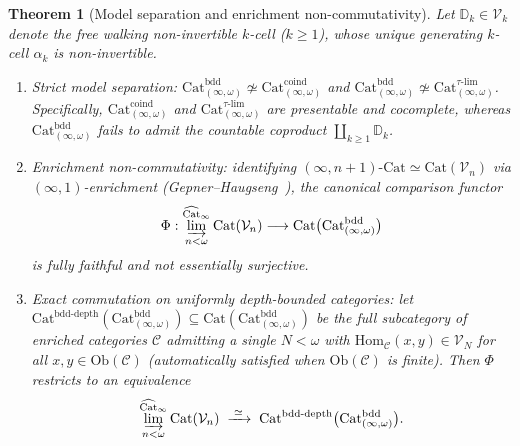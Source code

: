 \documentclass[11pt]{article}
\theoremstyle{plain}
\newtheorem{theorem}{Theorem}[section]
\theoremstyle{definition}
\newcommand{\cC}{\mathcal{C}}
\newcommand{\Ob}{\mathrm{Ob}}
\newcommand{\Hom}{\mathrm{Hom}}
\newcommand{\Cat}{\mathrm{Cat}}
\begin{document}
\begin{theorem}[Model separation and enrichment non-commutativity]\label{thm:enrichment-noncommutativity}
Let $\mathbb{D}_k \in \mathcal{V}_k$ denote the free walking non-invertible $k$-cell ($k \ge 1$), whose unique generating $k$-cell $\alpha_k$ is non-invertible.
\begin{enumerate}[nosep,label=(\roman*)]
\item \emph{Strict model separation}: $\Cat_{(\infty,\omega)}^{\mathrm{bdd}} \not\simeq \Cat_{(\infty,\omega)}^{\mathrm{coind}}$ and $\Cat_{(\infty,\omega)}^{\mathrm{bdd}} \not\simeq \Cat_{(\infty,\omega)}^{\tau\text{-}\mathrm{lim}}$. Specifically, $\Cat_{(\infty,\omega)}^{\mathrm{coind}}$ and $\Cat_{(\infty,\omega)}^{\tau\text{-}\mathrm{lim}}$ are presentable and cocomplete, whereas $\Cat_{(\infty,\omega)}^{\mathrm{bdd}}$ fails to admit the countable coproduct $\coprod_{k \ge 1} \mathbb{D}_k$.
\item \emph{Enrichment non-commutativity}: identifying $(\infty, n+1)\text{-}\Cat \simeq \Cat(\mathcal{V}_n)$ via $(\infty,1)$-enrichment (Gepner--Haugseng~\cite{GepnerHaugseng2015}), the canonical comparison functor
\[
  \Phi : \varinjlim_{n < \omega}^{\widehat{\Cat}_\infty} \Cat(\mathcal{V}_n) \longrightarrow \Cat\bigl(\Cat_{(\infty,\omega)}^{\mathrm{bdd}}\bigr)
\]
is fully faithful and \emph{not} essentially surjective.
\item \emph{Exact commutation on uniformly depth-bounded categories}: let $\Cat^{\mathrm{bdd\text{-}depth}}(\Cat_{(\infty,\omega)}^{\mathrm{bdd}}) \subseteq \Cat(\Cat_{(\infty,\omega)}^{\mathrm{bdd}})$ be the full subcategory of enriched categories $\cC$ admitting a single $N < \omega$ with $\Hom_{\cC}(x, y) \in \mathcal{V}_N$ for all $x, y \in \Ob(\cC)$ (automatically satisfied when $\Ob(\cC)$ is finite). Then $\Phi$ restricts to an equivalence
\[
  \varinjlim_{n < \omega}^{\widehat{\Cat}_\infty} \Cat(\mathcal{V}_n) \;\xrightarrow{\;\simeq\;}\; \Cat^{\mathrm{bdd\text{-}depth}}\bigl(\Cat_{(\infty,\omega)}^{\mathrm{bdd}}\bigr).
\]
\end{enumerate}
\end{theorem}
\end{document}
